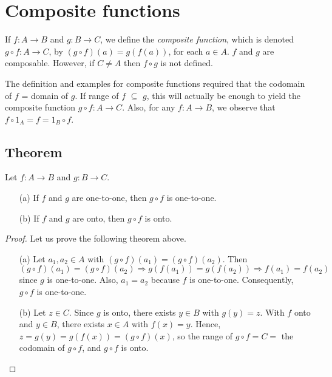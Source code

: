 \documentclass[11pt]{article}
\begin{document}
    \section{Composite functions}

    If \(f:A \rightarrow B\) and \(g: B \rightarrow C\), we define the \emph{composite function}, which is denoted \(g \circ f: A \rightarrow C\), by \((g \circ f)(a) = g(f(a))\), for each \(a \in A\). $f$ and $g$ are composable. However, if \(C \neq A\) then \(f \circ g\) is not defined.

    \vspace{1em}

    The definition and examples for composite functions required that the codomain of $f$ = domain of $g$. If range of $f$ \(\subseteq\) $g$, this will actually be enough to yield the composite function \(g \circ f: A \rightarrow C\). Also, for any \(f:A \rightarrow B\), we observe that \(f \circ 1_A = f = 1_B \circ f\).

    \subsection{Theorem}

    Let \(f:A \rightarrow B\) and \(g:B \rightarrow C\).
    \begin{enumerate}
        \item[(a)] If  $f$ and $g$ are one-to-one, then \(g \circ f\) is one-to-one.
        \item[(b)] If $f$ and $g$ are onto, then \(g \circ f\) is onto.   
    \end{enumerate}

    \begin{proof} Let us prove the following theorem above.
        \begin{enumerate}
            \item[(a)] Let \(a_1, a_2 \in A\) with \((g \circ f)(a_1) = (g \circ f)(a_2)\). Then \[(g \circ f)(a_1) = (g \circ f)(a_2) \Rightarrow g(f(a_1)) = g(f(a_2)) \Rightarrow f(a_1) = f(a_2)\] since $g$ is one-to-one. Also, \(a_1 = a_2\) because $f$ is one-to-one. Consequently, \(g \circ f\) is one-to-one. 
            \item[(b)] Let \(z \in C\). Since $g$ is onto, there exists \(y \in B\) with \(g(y) = z.\) With $f$ onto and \(y \in B\), there exists \(x \in A\) with \(f(x) = y\). Hence, \(z = g(y) = g(f(x)) = (g \circ f)(x)\), so the range of \(g \circ f = C = \) the codomain of \(g \circ f\), and \(g \circ f\) is onto. 
        \end{enumerate}
    \end{proof}
\end{document}
